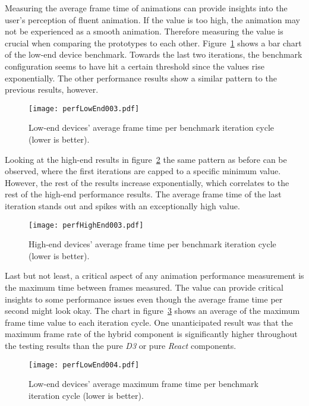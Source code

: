 
Measuring the average frame time of animations can provide insights into the user's perception of fluent animation. If the value is too high, the animation may not be experienced as a smooth animation. Therefore measuring the value is crucial when comparing the prototypes to each other. Figure~\ref{fig:perfLowEnd003} shows a bar chart of the low-end device benchmark. Towards the last two iterations, the benchmark configuration seems to have hit a certain threshold since the values rise exponentially. The other performance results show a similar pattern to the previous results, however.

\begin{figure}
\centering
\texttt{[image: perfLowEnd003.pdf]}
\caption{Low-end devices' average frame time per benchmark iteration cycle (lower is better).}
\label{fig:perfLowEnd003}
\end{figure}

Looking at the high-end results in figure~\ref{fig:perfHighEnd003} the same pattern as before can be observed, where the first iterations are capped to a specific minimum value. However, the rest of the results increase exponentially, which correlates to the rest of the high-end performance results. The average frame time of the last iteration stands out and spikes with an exceptionally high value.

\begin{figure}
\centering
\texttt{[image: perfHighEnd003.pdf]}
\caption{High-end devices' average frame time per benchmark iteration cycle (lower is better).}
\label{fig:perfHighEnd003}
\end{figure}

Last but not least, a critical aspect of any animation performance measurement is the maximum time between frames measured. The value can provide critical insights to some performance issues even though the average frame time per second might look okay. The chart in figure~\ref{fig:perfLowEnd004} shows an average of the maximum frame time value to each iteration cycle. One unanticipated result was that the maximum frame rate of the hybrid component is sig\-nifi\-cantly higher throughout the testing results than the pure \emph{D3} or pure \emph{React} components.

\begin{figure}
\centering
\texttt{[image: perfLowEnd004.pdf]}
\caption{Low-end devices' average maximum frame time per benchmark iteration cycle (lower is better).}
\label{fig:perfLowEnd004}
\end{figure}

